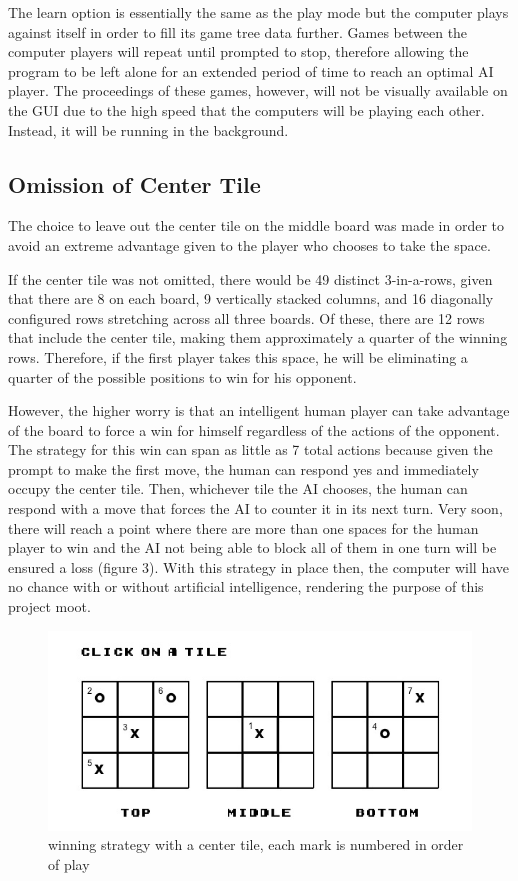 \documentclass[preprint,12pt]{elsarticle}
\begin{document}
		The learn option is essentially the same as the play mode but the computer plays against itself in order to fill its game tree data further. Games between the computer players will repeat until prompted to stop, therefore allowing the program to be left alone for an extended period of time to reach an optimal AI player. The proceedings of these games, however, will not be visually available on the GUI due to the high speed that the computers will be playing each other. Instead, it will be running in the background.

	\subsection{Omission of Center Tile}
		The choice to leave out the center tile on the middle board was made in order to avoid an extreme advantage given to the player who chooses to take the space.

		If the center tile was not omitted, there would be 49 distinct 3-in-a-rows, given that there are 8 on each board, 9 vertically stacked columns, and 16 diagonally configured rows stretching across all three boards. Of these, there are 12 rows that include the center tile, making them approximately a quarter of the winning rows. Therefore, if the first player takes this space, he will be eliminating a quarter of the possible positions to win for his opponent.

		However, the higher worry is that an intelligent human player can take advantage of the board to force a win for himself regardless of the actions of the opponent. The strategy for this win can span as little as 7 total actions because given the prompt to make the first move, the human can respond yes and immediately occupy the center tile. Then, whichever tile the AI chooses, the human can respond with a move that forces the AI to counter it in its next turn. Very soon, there will reach a point where there are more than one spaces for the human player to win and the AI not being able to block all of them in one turn will be ensured a loss (figure 3). With this strategy in place then, the computer will have no chance with or without artificial intelligence, rendering the purpose of this project moot.

		\begin{figure}[h]
			\centering\includegraphics[width=0.75\linewidth]{3.jpg}
			\caption{winning strategy with a center tile, each mark is numbered in order of play}
		\end{figure}
\end{document}
